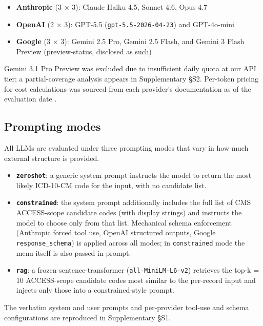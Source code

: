 \begin{itemize}
\tightlist
\item
  \textbf{Anthropic} (3 × 3): Claude Haiku 4.5, Sonnet 4.6, Opus 4.7
\item
  \textbf{OpenAI} (2 × 3): GPT-5.5 (\texttt{gpt-5.5-2026-04-23}) and GPT-4o-mini
  \autocite{OpenAIModels2026}
\item
  \textbf{Google} (3 × 3): Gemini 2.5 Pro, Gemini 2.5 Flash, and Gemini 3
  Flash Preview (preview-status, disclosed as such) \autocite{GeminiModels2026}
\end{itemize}

Gemini 3.1 Pro Preview was excluded due to insufficient daily quota
at our API tier; a partial-coverage analysis appears in
Supplementary §S2. Per-token pricing for cost calculations was
sourced from each provider's documentation as of the evaluation date
\autocite{OpenAIPricing2026,GeminiPricing2026}.

\subsection{Prompting modes}\label{prompting-modes}

All LLMs are evaluated under three prompting modes that vary in how
much external structure is provided.

\begin{itemize}
\tightlist
\item
  \textbf{\texttt{zeroshot}}: a generic system prompt instructs the model to
  return the most likely ICD-10-CM code for the input, with no
  candidate list.
\item
  \textbf{\texttt{constrained}}: the system prompt additionally includes the
  full list of CMS ACCESS-scope candidate codes (with display
  strings) and instructs the model to choose only from that list.
  Mechanical schema enforcement (Anthropic forced tool use, OpenAI
  structured outputs, Google \texttt{response\_schema}) is applied across
  all modes; in \texttt{constrained} mode the menu itself is also passed
  in-prompt.
\item
  \textbf{\texttt{rag}}: a frozen sentence-transformer (\texttt{all-MiniLM-L6-v2})
  retrieves the top-k = 10 ACCESS-scope candidate codes most similar
  to the per-record input and injects only those into a
  constrained-style prompt.
\end{itemize}

The verbatim system and user prompts and per-provider tool-use and
schema configurations are reproduced in Supplementary §S1.

